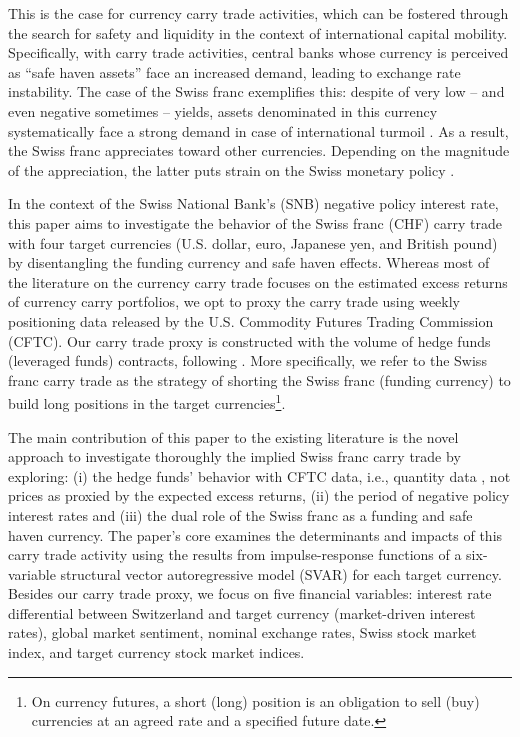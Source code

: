 \documentclass[a4paper, twoside]{templates/ociamthesis}
\begin{document}
This is the case for currency carry trade activities, which can be fostered through the search for safety and liquidity in the context of international capital mobility. Specifically, with carry trade activities, central banks whose currency is perceived as ``safe haven assets'' face an increased demand, leading to exchange rate instability. The case of the Swiss franc exemplifies this: despite of very low -- and even negative sometimes -- yields, assets denominated in this currency systematically face a strong demand in case of international turmoil \autocite{guillaumin2012,vallet2016}. As a result, the Swiss franc appreciates toward other currencies. Depending on the magnitude of the appreciation, the latter puts strain on the Swiss monetary policy \autocite{gubler2014}.

In the context of the Swiss National Bank's (SNB) negative policy interest rate, this paper aims to investigate the behavior of the Swiss franc (CHF) carry trade with four target currencies (U.S. dollar, euro, Japanese yen, and British pound) by disentangling the funding currency and safe haven effects. Whereas most of the literature on the currency carry trade focuses on the estimated excess returns of currency carry portfolios, we opt to proxy the carry trade using weekly positioning data released by the U.S. Commodity Futures Trading Commission (CFTC). Our carry trade proxy is constructed with the volume of hedge funds (leveraged funds) contracts, following \textcite{fong2013}. More specifically, we refer to the Swiss franc carry trade as the strategy of shorting the Swiss franc (funding currency) to build long positions in the target currencies\footnote{On currency futures, a short (long) position is an obligation to sell (buy) currencies at an agreed rate and a specified future date.}.

The main contribution of this paper to the existing literature is the novel approach to investigate thoroughly the implied Swiss franc carry trade by exploring: (i) the hedge funds' behavior with CFTC data, i.e., quantity data \autocite{dupuy2021}, not prices as proxied by the expected excess returns, (ii) the period of negative policy interest rates and (iii) the dual role of the Swiss franc as a funding and safe haven currency. The paper's core examines the determinants and impacts of this carry trade activity using the results from impulse-response functions of a six-variable structural vector autoregressive model (SVAR) for each target currency. Besides our carry trade proxy, we focus on five financial variables: interest rate differential between Switzerland and target currency (market-driven interest rates), global market sentiment, nominal exchange rates, Swiss stock market index, and target currency stock market indices.
\end{document}
